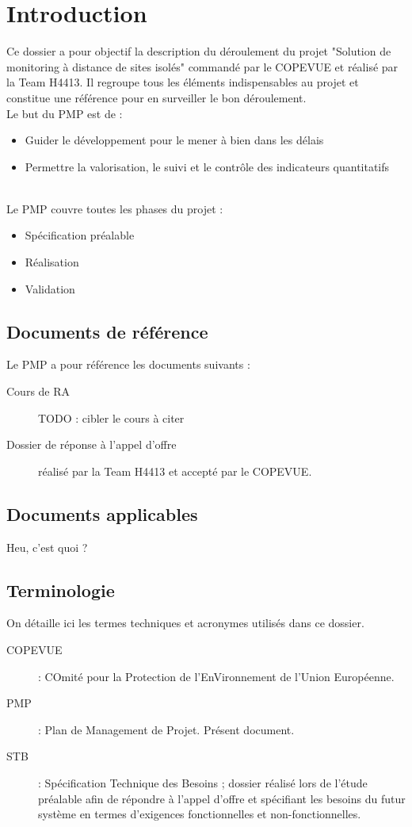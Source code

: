 \section{Introduction}

Ce dossier a pour objectif la description du déroulement du projet
"Solution de monitoring à distance de sites isolés" commandé par le
COPEVUE et réalisé par la Team H4413. Il regroupe tous les éléments
indispensables au projet et constitue une référence pour en surveiller le
bon déroulement.\\

Le but du PMP est de :
\begin{itemize}
\item Guider le développement pour le mener à bien dans les délais
\item Permettre la valorisation, le suivi et le contrôle des indicateurs
quantitatifs
\end{itemize}
\hfill\\

Le PMP couvre toutes les phases du projet :
\begin{itemize}
\item Spécification préalable
\item Réalisation
\item Validation
\end{itemize}


\subsection{Documents de référence}

Le PMP a pour référence les documents suivants :
\begin{description}
\item[Cours de RA] TODO : cibler le cours à citer
\item[Dossier de réponse à l'appel d'offre] réalisé par la Team H4413 et
accepté par le COPEVUE.
\end{description}


\subsection{Documents applicables}

Heu, c'est quoi ?


\subsection{Terminologie}

On détaille ici les termes techniques et acronymes utilisés dans ce
dossier.

\begin{description}
\item[COPEVUE] : COmité pour la Protection de l'EnVironnement de l'Union
Européenne.
\item[PMP] : Plan de Management de Projet. Présent document.
\item[STB] : Spécification Technique des Besoins ; dossier réalisé lors de
l'étude préalable afin de répondre à l'appel d'offre et spécifiant les
besoins du futur système en termes d'exigences fonctionnelles et
non-fonctionnelles.
\end{description}
